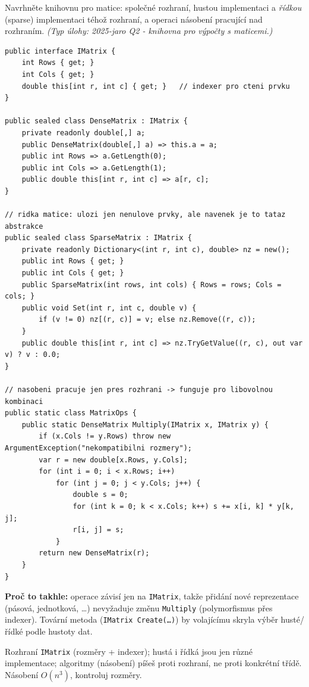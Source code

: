 \begin{zadani}
Navrhněte knihovnu pro matice: společné rozhraní, hustou implementaci a \emph{řídkou} (sparse) implementaci téhož rozhraní, a operaci násobení pracující nad rozhraním. \emph{(Typ úlohy: 2025-jaro Q2 - knihovna pro výpočty s maticemi.)}
\end{zadani}

\begin{reseni}
\begin{lstlisting}
public interface IMatrix {
    int Rows { get; }
    int Cols { get; }
    double this[int r, int c] { get; }   // indexer pro cteni prvku
}

public sealed class DenseMatrix : IMatrix {
    private readonly double[,] a;
    public DenseMatrix(double[,] a) => this.a = a;
    public int Rows => a.GetLength(0);
    public int Cols => a.GetLength(1);
    public double this[int r, int c] => a[r, c];
}

// ridka matice: ulozi jen nenulove prvky, ale navenek je to tataz abstrakce
public sealed class SparseMatrix : IMatrix {
    private readonly Dictionary<(int r, int c), double> nz = new();
    public int Rows { get; }
    public int Cols { get; }
    public SparseMatrix(int rows, int cols) { Rows = rows; Cols = cols; }
    public void Set(int r, int c, double v) {
        if (v != 0) nz[(r, c)] = v; else nz.Remove((r, c));
    }
    public double this[int r, int c] => nz.TryGetValue((r, c), out var v) ? v : 0.0;
}

// nasobeni pracuje jen pres rozhrani -> funguje pro libovolnou kombinaci
public static class MatrixOps {
    public static DenseMatrix Multiply(IMatrix x, IMatrix y) {
        if (x.Cols != y.Rows) throw new ArgumentException("nekompatibilni rozmery");
        var r = new double[x.Rows, y.Cols];
        for (int i = 0; i < x.Rows; i++)
            for (int j = 0; j < y.Cols; j++) {
                double s = 0;
                for (int k = 0; k < x.Cols; k++) s += x[i, k] * y[k, j];
                r[i, j] = s;
            }
        return new DenseMatrix(r);
    }
}
\end{lstlisting}
\textbf{Proč to takhle:} operace závisí jen na \texttt{IMatrix}, takže přidání nové reprezentace (pásová, jednotková, \dots) nevyžaduje změnu \texttt{Multiply} (polymorfismus přes indexer). Tovární metoda (\texttt{IMatrix Create(\dots)}) by volajícímu skryla výběr husté/řídké podle hustoty dat.
\end{reseni}

\begin{jadro}
Rozhraní \texttt{IMatrix} (rozměry + indexer); hustá i řídká jsou jen různé implementace; algoritmy (násobení) píšeš proti rozhraní, ne proti konkrétní třídě. Násobení $O(n^3)$, kontroluj rozměry.
\end{jadro}

